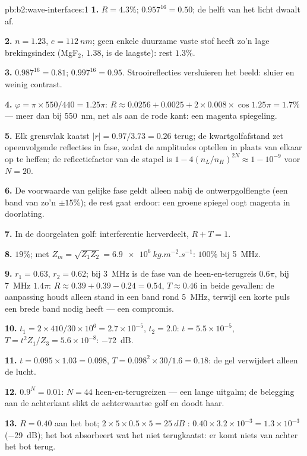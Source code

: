 \begin{solution}{pb:b2:wave-interfaces:1}
\textbf{1.} $R = 4.3\%$; $0.957^{16} = 0.50$; de helft van het licht dwaalt af.

\textbf{2.} $n = 1.23$, $e = \qty{112}{nm}$; geen enkele duurzame vaste stof
heeft zo'n lage brekingsindex (MgF$_2$, $1.38$, is de laagste): rest
$1.3\%$.

\textbf{3.} $0.987^{16} = 0.81$; $0.997^{16} = 0.95$. Strooireflecties
versluieren het beeld: sluier en weinig contrast.

\textbf{4.} $\varphi = \pi \times 550/440 = 1.25\pi$:
$R \approx 0.0256 + 0.0025 + 2 \times 0.008 \times
\cos1.25\pi = 1.7\%$ ---
meer dan bij \qty{550}{nm}, net als aan de rode kant: een magenta
spiegeling.

\textbf{5.} Elk grensvlak kaatst $|r| = 0.97/3.73 = 0.26$ terug; de
kwartgolfafstand zet opeenvolgende reflecties in fase, zodat de amplitudes
optellen in plaats van elkaar op te heffen; de reflectiefactor van de stapel
is $1 - 4(n_L/n_H)^{2N}
\approx 1 - 10^{-9}$ voor $N = 20$.

\textbf{6.} De voorwaarde van gelijke fase geldt alleen nabij de
ontwerpgolflengte (een band van zo'n $\pm15\%$); de rest gaat erdoor: een
groene spiegel oogt magenta in doorlating.

\textbf{7.} In de doorgelaten golf: interferentie herverdeelt, $R + T = 1$.

\textbf{8.} $19\%$; met
$Z_m = \sqrt{Z_1Z_2} = \qty{6.9e6}{kg.m^{-2}.s^{-1}}$: $100\%$ bij
\qty{5}{MHz}.

\textbf{9.} $r_1 = 0.63$, $r_2 = 0.62$; bij \qty{3}{MHz} is de fase van de
heen-en-terugreis $0.6\pi$, bij \qty{7}{MHz} $1.4\pi$:
$R \approx 0.39 + 0.39 - 0.24 = 0.54$, $T \approx 0.46$ in beide gevallen:
de aanpassing houdt alleen stand in een band rond \qty{5}{MHz}, terwijl een
korte puls een brede band nodig heeft --- een compromis.

\textbf{10.} $t_1 = 2 \times 410/30 \times 10^6 = 2.7 \times 10^{-5}$,
$t_2 = 2.0$: $t = 5.5 \times 10^{-5}$,
$T = t^2Z_1/Z_3 = 5.6 \times 10^{-8}$: \qty{-72}{dB}.

\textbf{11.} $t = 0.095 \times 1.03 = 0.098$,
$T = 0.098^2 \times 30/1.6 = 0.18$: de gel verwijdert alleen de lucht.

\textbf{12.} $0.9^N = 0.01$: $N = 44$ heen-en-terugreizen --- een lange
uitgalm; de belegging aan de achterkant slikt de achterwaartse golf en doodt
haar.

\textbf{13.} $R = 0.40$ aan het bot;
$2 \times 5 \times 0.5 \times 5 = \qty{25}{dB}$ :
$0.40 \times 3.2 \times 10^{-3} = 1.3 \times 10^{-3}$ (\qty{-29}{dB}); het
bot absorbeert wat het niet terugkaatst: er komt niets van achter het bot
terug.


\end{solution}
